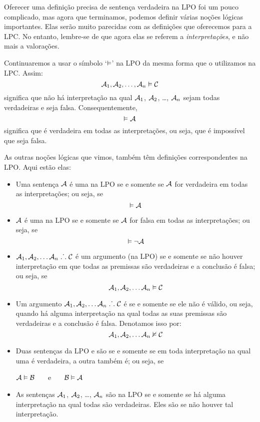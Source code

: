 Oferecer uma definição precisa de sentença verdadeira na LPO foi um pouco complicado, mas agora que terminamos, podemos definir várias noções lógicas importantes.
Elas serão muito parecidas com as definições que oferecemos para a LPC.
No entanto, lembre-se de que agora elas se referem a \emph{interpretações}, e não mais a valorações.

Continuaremos a usar o símbolo `$\vDash$' na LPO da mesma forma que o utilizamos na LPC.
Assim:
	$$\mathcal{A}_1, \mathcal{A}_2, \ldots, \mathcal{A}_n \vDash\mathcal{C}$$
significa que não há interpretação na qual $\mathcal{A}_1$, $\mathcal{A}_2$, \dots, $\mathcal{A}_n$ sejam todas verdadeiras e  seja falsa. Consequentemente,
	$$\vDash\mathcal{A}$$
significa que  é verdadeira em todas as interpretações, ou seja, que é impossível que  seja falsa.

As outras noções lógicas que vimos, também têm definições correspondentes na LPO.
Aqui estão elas:

\begin{itemize}
\item Uma sentença  $\mathcal{A}$ é uma  na LPO se e somente se $\mathcal{A}$ for verdadeira em todas as interpretações; ou seja, se
$$\vDash\mathcal{A}$$
\item $\mathcal{A}$ é uma  na LPO se e somente se $\mathcal{A}$ for falsa em todas as interpretações; ou seja, se
$$\vDash\neg\mathcal{A}$$
\item $\mathcal{A}_1, \mathcal{A}_2, \ldots \mathcal{A}_n \mathrel{\ldotp\dot{}\,\ldotp} \mathcal{C}$ é um argumento  (na LPO) se e somente se não houver interpretação em que todas as premissas são verdadeiras e a conclusão é falsa; ou seja, se
$$\mathcal{A}_1,\mathcal{A}_2,\ldots \mathcal{A}_n \vDash\mathcal{C}$$

\item Um argumento $\mathcal{A}_1, \mathcal{A}_2, \ldots \mathcal{A}_n \mathrel{\ldotp\dot{}\,\ldotp} \mathcal{C}$ é  se e somente se ele não é válido, ou seja, quando há alguma interpretação na qual todas as suas premissas são verdadeiras e a conclusão é falsa.
Denotamos isso por:
$$\mathcal{A}_1,\mathcal{A}_2,\ldots \mathcal{A}_n \nvDash\mathcal{C}$$
 
\item Duas sentenças da LPO  e  são  se e somente se em toda interpretação na qual uma é verdadeira, a outra também é; ou seja, se
\begin{center}
	$\mathcal{A}\vDash\mathcal{B}$ \ \ \ e \ \ \ $\mathcal{B}\vDash\mathcal{A}$
\end{center}

\item As sentenças $\mathcal{A}_1$, $\mathcal{A}_2$, \dots, $\mathcal{A}_n$ são  na LPO se e somente se há alguma interpretação na qual todas são verdadeiras.
Eles são  se não houver tal interpretação.
\end{itemize}


